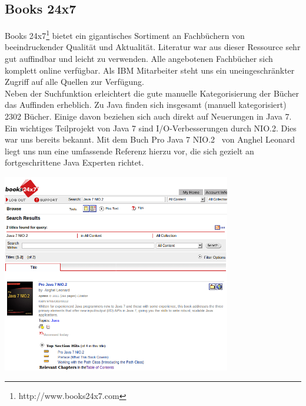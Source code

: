 %

\subsection{Books 24x7}
Books 24x7\footnote{http://www.books24x7.com} bietet ein gigantisches Sortiment an Fachbüchern von beeindruckender Qualität und Aktualität. Literatur war aus dieser Ressource sehr gut auffindbar und leicht zu verwenden. Alle angebotenen Fachbücher sich komplett online verfügbar. Als IBM Mitarbeiter steht uns ein uneingeschränkter Zugriff auf alle Quellen zur Verfügung.\\

Neben der Suchfunktion erleichtert die gute manuelle Kategorisierung der Bücher das Auffinden erheblich. Zu Java finden sich insgesamt (manuell kategorisiert) 2302 Bücher. Einige davon beziehen sich auch direkt auf Neuerungen in Java 7.\\

Ein wichtiges Teilprojekt von Java 7 sind I/O-Verbesserungen durch NIO.2. Dies war uns bereits bekannt. Mit dem Buch \glqq Pro Java 7 NIO.2\grqq\cite{b247nio2} ~von Anghel Leonard liegt uns nun eine umfassende Referenz hierzu vor, die sich gezielt an fortgeschrittene Java Experten richtet.

\begin{center}
\includegraphics[width=10cm]{images/books247.png}
\end{center}

